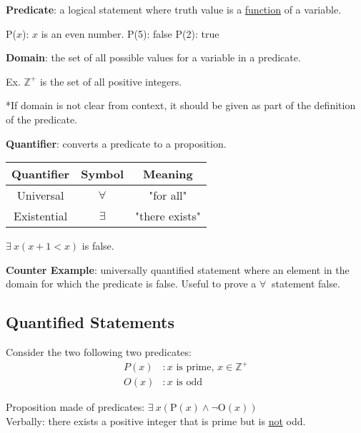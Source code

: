 \textbf{Predicate}: a logical statement where truth value is a \underline{function} of a variable.

\begin{center}
  P($x$): $x$ is an even number. \qquad P(5): false \qquad P(2): true
\end{center}

\noindent \textbf{Domain}: the set of all possible values for a variable in a predicate.

\begin{center}
  Ex. $ \mathbb{Z}^+ $ is the set of all positive integers.

  *If domain is not clear from context, it should be given as part of the definition of the predicate.
\end{center}

\noindent \textbf{Quantifier}: converts a predicate to a proposition.
\qquad
\begin{tabular}{c|c|c}
  Quantifier  & Symbol     & Meaning        \\
  \hline
  Universal   & $\forall$ & "for all"      \\
  Existential & $\exists$  & "there exists" \\
\end{tabular}

\begin{center}
  $\exists~ x (x+1 < x)$ is false.
\end{center}

\noindent \textbf{Counter Example}: universally quantified statement where an element in the domain
for which the predicate is false. Useful to prove a $\forall~$ statement false.

\subsection{Quantified Statements}

Consider the two following two predicates:
\begin{align*}
  P(x) & : x \text{ is prime, } x \in \mathbb{Z}^+ \\
  O(x) & : x \text{ is odd}
\end{align*}

\begin{center}
  Proposition made of predicates: \qquad $\exists~ x (\text{P}(x) \land \lnot \text{O}(x))$ \\
  Verbally: there exists a positive integer that is prime but is \underline{not} odd.
\end{center}


